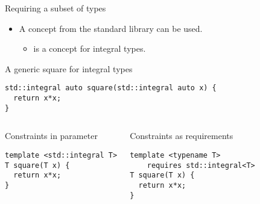 \begin{frame}[t,fragile]{Requiring a subset of types}
\begin{itemize}
  \item A concept from the standard library can be used.
    \begin{itemize}
      \item {} is a concept for integral types.
    \end{itemize}
\end{itemize}

\begin{block}{A generic square for integral types}
\begin{lstlisting}
std::integral auto square(std::integral auto x) {
  return x*x;
}
\end{lstlisting}
\end{block}

\begin{columns}[T]

\pause
{}
\begin{block}{Constraints in parameter}
\begin{lstlisting}
template <std::integral T>
T square(T x) { 
  return x*x; 
}
\end{lstlisting}
\end{block}

\pause
{}
\begin{block}{Constraints as requirements}
\begin{lstlisting}
template <typename T>
    requires std::integral<T>
T square(T x) { 
  return x*x; 
}
\end{lstlisting}
\end{block}

\end{columns}

\end{frame}



